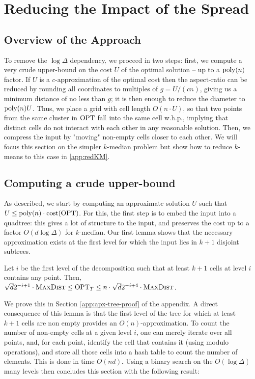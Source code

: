 \section{Reducing the Impact of the Spread}
\label{sec:logdelta}
\newcommand{\boxsize}{\textsc{MaxDist}}

\subsection{Overview of the Approach}

To remove the $\log\Delta$ dependency, we proceed in two steps: first, we compute a very crude upper-bound on the cost $U$ of the optimal solution -- up to
a $\operatorname{poly}(n)$ factor.  If $U$ is a $c$-approximation of the optimal cost then the aspect-ratio can be reduced by rounding all coordinates to multiples of $g
= U/(cn)$, giving us a minimum distance of no less than $g$; it is then enough to reduce the diameter to $\operatorname{poly}(n) U$.  Thus, we place a grid with cell length
$O(n \cdot U)$, so that two points from the same cluster in $\text{OPT}$ fall into the same cell w.h.p., implying that distinct cells do not interact with each other
in any reasonable solution.  Then, we compress the input by "moving" non-empty cells closer to each other. We will focus this section on the simpler $k$-median
problem but show how to reduce $k$-means to this case in \cref{app:redKM}.


\subsection{Computing a crude upper-bound}

As described, we start by computing an approximate solution $U$ such that $U \leq \operatorname{poly}(n) \cdot \operatorname{cost}(\text{OPT})$. For this, the first step is to embed the input
into a quadtree: this gives a lot of structure to the input, and preserves the cost up to a factor $O(d \log \Delta)$ for $k$-median.  Our first lemma shows
that the necessary approximation exists at the first level for which the input lies in $k+1$ disjoint subtrees. 

\begin{lemma}\label{lem:apxTree}
Let $i$ be the first level of the decomposition such that at least $k+1$ cells at level $i$ contains any point. Then, $\sqrt{d}2^{-i+1} \cdot \boxsize \leq
\opt_T \leq n \cdot \sqrt{d}2^{-i+4} \cdot \boxsize$.
\end{lemma}

We prove this in Section \ref{app:apx-tree-proof} of the appendix. A direct consequence of this lemma is that the first level of the tree for which at least
$k+1$ cells are non empty provides an $O(n)$-approximation. To count the number of non-empty cells at a given level $i$, one can merely iterate over all
points, and, for each point, identify the cell that contains it (using modulo operations), and store all those cells into a hash table to count the number of elements.
This is done in time $O(nd)$.  Using a binary search on the $O(\log \Delta)$ many levels then concludes this section with the following result:

